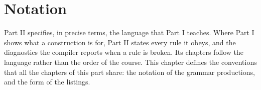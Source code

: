 \chapter{Notation}%
\label{chap:notation}

Part II specifies, in precise terms, the language that Part I teaches. Where
Part I shows what a construction is for, Part II states every rule it obeys,
and the diagnostics the compiler reports when a rule is broken. Its chapters
follow the language rather than the order of the course. This chapter defines the conventions that all the chapters of this part
share: the notation of the grammar productions, and the form of the listings.


